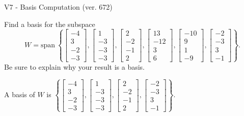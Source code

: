 \begin{exercise}
  \begin{exerciseTitle}V7 - Basis Computation (ver. 672)\end{exerciseTitle}
  \begin{exerciseStatement}
    Find a basis for the subspace 
\[W=\mathrm{span}\ \left\{\left[\begin{array}{r}
-4 \\
3 \\
-2 \\
-3
\end{array}\right] , \left[\begin{array}{r}
1 \\
-3 \\
-3 \\
-3
\end{array}\right] , \left[\begin{array}{r}
2 \\
-2 \\
-1 \\
2
\end{array}\right] , \left[\begin{array}{r}
13 \\
-12 \\
3 \\
6
\end{array}\right] , \left[\begin{array}{r}
-10 \\
9 \\
1 \\
-9
\end{array}\right] , \left[\begin{array}{r}
-2 \\
-3 \\
3 \\
-1
\end{array}\right]\right\}.\]
 Be sure to explain why your result is a basis.


  \end{exerciseStatement}
  \begin{exerciseAnswer}
   A basis of \(W\) is  \(\left\{\left[\begin{array}{r}
-4 \\
3 \\
-2 \\
-3
\end{array}\right] , \left[\begin{array}{r}
1 \\
-3 \\
-3 \\
-3
\end{array}\right] , \left[\begin{array}{r}
2 \\
-2 \\
-1 \\
2
\end{array}\right] , \left[\begin{array}{r}
-2 \\
-3 \\
3 \\
-1
\end{array}\right]\right\}\).
  


  \end{exerciseAnswer}
\end{exercise}